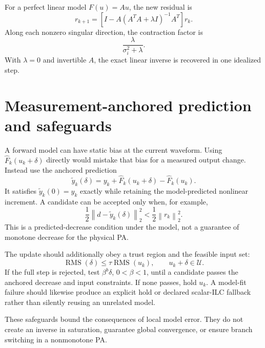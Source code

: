 \documentclass[10pt,a4paper]{article}
\newcommand{\norm}[1]{\left\lVert #1\right\rVert_2}
\newcommand{\rms}{\operatorname{RMS}}
\newcommand{\Fhat}{\widehat F}
\begin{document}
For a perfect linear model $F(u)=Au$, the new residual is
\begin{equation}
  r_{k+1}
  =\left[I-A(A^TA+\lambda I)^{-1}A^T\right]r_k.
\end{equation}
Along each nonzero singular direction, the contraction factor is
\begin{equation}
  \frac{\lambda}{\sigma_i^2+\lambda}.
\end{equation}
With $\lambda=0$ and invertible $A$, the exact linear inverse is recovered in one idealized step.

\section{Measurement-anchored prediction and safeguards}

A forward model can have static bias at the current waveform. Using $\Fhat_k(u_k+\delta)$ directly would
mistake that bias for a measured output change. Instead use the anchored prediction
\begin{equation}
  \widetilde y_k(\delta)
  =y_k+\Fhat_k(u_k+\delta)-\Fhat_k(u_k).
  \label{eq:anchored-prediction}
\end{equation}
It satisfies $\widetilde y_k(0)=y_k$ exactly while retaining the model-predicted nonlinear increment. A
candidate can be accepted only when, for example,
\begin{equation}
  \frac12\norm{d-\widetilde y_k(\delta)}^{2}
  <\frac12\norm{r_k}^{2}.
  \label{eq:anchored-acceptance}
\end{equation}
This is a predicted-decrease condition under the model, not a guarantee of monotone decrease for the
physical PA.

The update should additionally obey a trust region and the feasible input set:
\begin{equation}
  \rms(\delta)\leq\tau\rms(u_k),
  \qquad
  u_k+\delta\in\mathcal U.
  \label{eq:safeguards}
\end{equation}
If the full step is rejected, test $\beta^b\delta$, $0<\beta<1$, until a candidate passes the anchored
decrease and input constraints. If none passes, hold $u_k$. A model-fit failure should likewise produce an
explicit hold or declared scalar-ILC fallback rather than silently reusing an unrelated model.

These safeguards bound the consequences of local model error. They do not create an inverse in saturation,
guarantee global convergence, or ensure branch switching in a nonmonotone PA.
\end{document}
